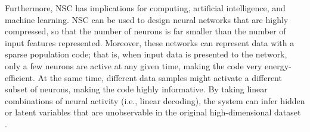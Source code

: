 Furthermore, NSC has implications for computing, artificial intelligence, and machine learning. \ac{NSC} can be used to design neural networks that are highly compressed, so that the number of neurons is far smaller than the number of input features represented. 
Moreover, these networks can represent data with a sparse population code; that is, when input data is presented to the network, only a few neurons are active at any given time, making the code very energy-efficient. At the same time, different data samples might activate a different subset of neurons, making the code highly informative. By taking linear combinations of neural activity (i.e., linear decoding), the system can infer hidden or latent variables that are unobservable in the original high-dimensional dataset \cite{PougetSnyder2000}.
%


